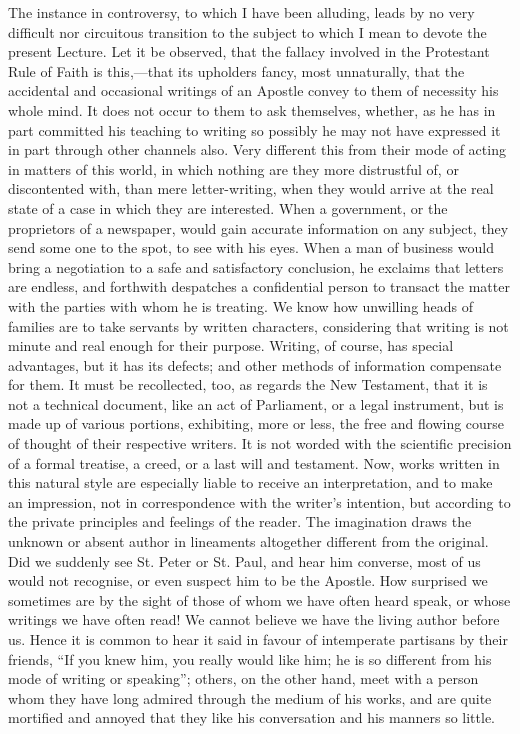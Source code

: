 The instance in controversy, to which I have been
alluding, leads by no very difficult nor circuitous
transition to the subject to which I mean to devote the
present Lecture. Let it be observed, that the fallacy
involved in the Protestant Rule of Faith is this,—that
its upholders fancy, most unnaturally, that the
accidental and occasional writings of an Apostle convey
to them of necessity his whole mind. It does not occur to
them to ask themselves, whether, as he has in part
committed his teaching to writing so possibly he may not
have expressed it in part through other channels also.
Very different this from their mode of acting in matters
of this world, in which nothing are they more distrustful
of, or discontented with, than mere letter-writing, when
they would arrive at the real state of a case in which
they are interested. When a government, or the
proprietors of a newspaper, would gain accurate
information on any subject, they send some one to the
spot, to see with his eyes. When a man of business would
bring a negotiation to a safe and satisfactory
conclusion, he exclaims that letters are endless, and
forthwith despatches a confidential person to transact
the matter with the parties with whom he is treating. We
know how unwilling heads of families are to take servants
by written characters, considering that writing is not
minute and real enough for their purpose. Writing, of
course, has special advantages, but it has its defects;
and other methods of information compensate for them. It
must be recollected, too, as regards the New Testament,
that it is not a technical document, like an act of
Parliament, or a legal instrument, but is made up of
various portions, exhibiting, more or less, the free and
flowing course of thought of their respective writers. It
is not worded with the scientific precision of a formal
treatise, a creed, or a last will and testament. Now,
works written in this natural style are especially liable
to receive an interpretation, and to make an impression,
not in correspondence with the writer's intention, but
according to the private principles and feelings of the
reader. The imagination draws the unknown or absent
author in lineaments altogether different from the
original. Did we suddenly see St. Peter or St. Paul, and
hear him converse, most of us would not recognise, or
even suspect him to be the Apostle. How surprised we
sometimes are by the sight of those of whom we have often
heard speak, or whose writings we have often read! We
cannot believe we have the living author before us. Hence
it is common to hear it said in favour of intemperate
partisans by their friends, ``If you knew him, you
really would like him; he is so different from his mode
of writing or speaking''; others, on the other hand,
meet with a person whom they have long admired through
the medium of his works, and are quite mortified and
annoyed that they like his conversation and his manners
so little.

